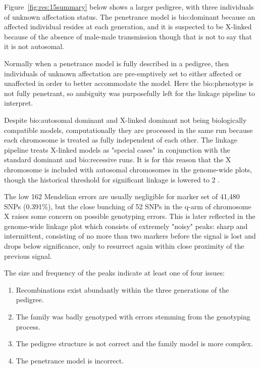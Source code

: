 Figure~\ref{fig:res:15summary} below shows a larger pedigree, with three individuals of unknown affectation status. The penetrance model is \gls{bio:dominant} because an affected individual resides at each generation, and it is suspected to be X-linked because of the absence of male-male transmission though that is not to say that it is not autosomal.

Normally when a penetrance model is fully described in a pedigree, then individuals of unknown affectation are pre-emptively set to either affected or unaffected in order to better accommodate the model. Here the \gls{bio:phenotype} is not fully penetrant, so ambiguity was purposefully left for the linkage pipeline to interpret.

Despite \gls{bio:autosomal} dominant and X-linked dominant not being biologically compatible models, computationally they are processed in the same run because each chromosome is treated as fully independent of each other. The linkage pipeline treats X-linked models as "special cases" in conjunction with the standard dominant and \gls{bio:recessive} runs. It is for this reason that the X chromosome is included with autosomal chromosomes in the genome-wide plots, though the historical threshold for significant linkage is lowered to 2 \cite{morton1955sequential}.

The low 162 Mendelian errors are usually negligible for marker set of 41,480 SNPs (0.391\%), but the close bunching of 52 SNPs in the q-arm of chromosome X raises some concern on possible genotyping errors. This is later reflected in the genome-wide linkage plot which consists of extremely "noisy" peaks: sharp and intermittent, consisting of no more than two markers before the signal is lost and drops below significance, only to resurrect again within close proximity of the previous signal.

The size and frequency of the peaks indicate at least one of four issues:
\vspace{-10pt}
\begin{spacing}{1.1}
\begin{enumerate}
\item{Recombinations exist abundantly within the three generations of the pedigree.}
\item{The family was badly genotyped with errors stemming from the genotyping process.}
\item{The pedigree structure is not correct and the family model is more complex.}
\item{The penetrance model is incorrect.}
\end{enumerate}
\end{spacing}

